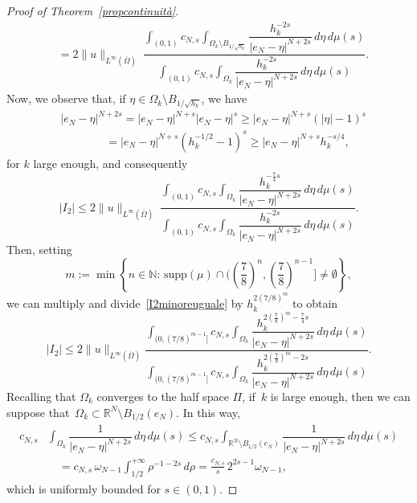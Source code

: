\documentclass[12pt,a4paper,intlimits,sumlimits]{amsart}
\def \N {\mathbb{N}}
\def \R {\mathbb{R}}
\theoremstyle{definition}
\theoremstyle{plain}
\numberwithin{equation}{section}
\renewcommand{\leq}{\leqslant}
\renewcommand{\geq}{\geqslant}
\begin{document}
\begin{proof}[Proof of Theorem~\ref{propcontinuità}]
\[\begin{aligned}
&=2\|u\|_{L^\infty(\overline{\Omega})} \ \dfrac{\displaystyle\int_{(0,1)}c_{N,s}\int_{\Omega_k\setminus B_{1/{\sqrt{h_k}}}}\dfrac{h_k^{-2s}}{|e_N-\eta|^{N+2s}}\,d\eta\,d\mu(s)}{\displaystyle\int_{(0,1)}c_{N,s}\int_{\Omega_k}\dfrac{h_k^{-2s}}{|e_N-\eta|^{N+2s}}\,d\eta\,d\mu(s)}.
\end{aligned}
\]
Now, we observe that, if 
$\eta \in \Omega_k\setminus B_{1/{\sqrt{h_k}}}$, we have
\[
\begin{aligned}&
|e_N-\eta|^{N+2s}=|e_N-\eta|^{N+s}|e_N-\eta|^s
\geq |e_N-\eta|^{N+s} (|\eta|-1)^s \\
&\qquad\qquad=|e_N-\eta|^{N+s} (h_k^{-1/2}-1)^s
\geq |e_N-\eta|^{N+s} h_k^{-s/4},
\end{aligned}
\]
for $k$ large enough, and consequently
\begin{equation}\label{I2minoreuguale}
|I_2|\leq 2\|u\|_{L^\infty(\overline{\Omega})} \ \dfrac{\displaystyle\int_{(0,1)}c_{N,s}\int_{\Omega_k}\dfrac{h_k^{-\frac{7}{4}s}}{|e_N-\eta|^{N+2s}}\,d\eta\,d\mu(s)}{\displaystyle\int_{(0,1)}c_{N,s}\int_{\Omega_k}\dfrac{h_k^{-2s}}{|e_N-\eta|^{N+2s}}\,d\eta\,d\mu(s)}.
\end{equation}
Then, setting
\begin{equation}\label{I2mMM}
m:=\min\left\{n\in \N:\, \mbox{supp}(\mu) \cap\Bigg(\left(\frac{7}{8}\right)^n,\left(\frac{7}{8}\right)^{n-1}\Bigg]\neq \emptyset\right\},
\end{equation}
we can multiply and divide~\eqref{I2minoreuguale} by $h_k^{2(7/8)^m}$ to obtain
\begin{equation}\label{I2minoreuguale7/8}
|I_2|\leq 2\|u\|_{L^\infty(\overline{\Omega})}
\dfrac{\displaystyle\int_{(0,(7/8)^{m-1}]}c_{N,s}\int_{\Omega_k}\dfrac{h_k^{2\left(\frac{7}{8}\right)^m-\frac{7}{4}s}}{|e_N-\eta|^{N+2s}}\,d\eta\,d\mu(s)}{\displaystyle\int_{(0,(7/8)^{m-1}]}c_{N,s}\int_{\Omega_k}\dfrac{h_k^{2\left(\frac{7}{8}\right)^m-2s}}{|e_N-\eta|^{N+2s}}\,d\eta\,d\mu(s)}.
\end{equation}
Recalling that $\Omega_k$ converges to the half space $\Pi$, if~$k$ is large enough, then we can suppose that~$\Omega_k \subset \R^N\setminus B_{1/2}(e_N)$. In this way, 
\[
\begin{aligned}
c_{N,s}&\int_{\Omega_k}\dfrac{1}{|e_N-\eta|^{N+2s}}\,d\eta\,d\mu(s)
\leq c_{N,s}\int_{\R^N\setminus B_{1/2}(e_N)}\dfrac{1}{|e_N-\eta|^{N+2s}}\,d\eta\,d\mu(s) \\
&\quad=c_{N,s} \,\omega_{N-1}\int_{1/2}^{+\infty}\rho^{-1-2s}\,d\rho
=\frac{c_{N,s}}{s}\,2^{2s-1}\omega_{N-1},
\end{aligned}
\]
which is uniformly bounded for $s\in (0,1)$. 


\end{proof}
\end{document}
